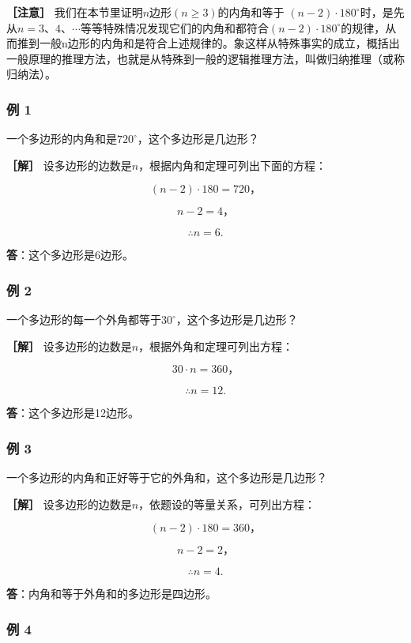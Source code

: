 \textbf{［注意］}
我们在本节里证明\(n\)边形\((n \geqslant 3)\)的内角和等于
\((n-2)\cdot180^{\circ}\)时，是先从\(n=3\text{、}4\text{、}\cdots\)等等特殊情况发现它们的内角和都符合\((n-2)\cdot180^{\circ}\)的规律，从而推到一般n边形的内角和是符合上述规律的。象这样从特殊事实的成立，概括出一般原理的推理方法，也就是从特殊到一般的逻辑推理方法，叫做归纳推理（或称归纳法）。

\subsubsection{例 1}

一个多边形的内角和是\(720^{\circ}\)，这个多边形是几边形？

\textbf{［解］} 设多边形的边数是\(n\)，根据内角和定理可列出下面的方程：

\[
(n - 2) \cdot 180 = 720\text{，}
\]

\[
n - 2 = 4\text{，}
\]

\[
\therefore n = 6.
\]

\textbf{答}：这个多边形是6边形。

\subsubsection{例 2}

一个多边形的每一个外角都等于\(30^{\circ}\)，这个多边形是几边形？

\textbf{［解］} 设多边形的边数是\(n\)，根据外角和定理可列出方程：

\[
30 \cdot n = 360\text{，}
\]

\[
\therefore n = 12.
\]

\textbf{答}：这个多边形是12边形。

\subsubsection{例 3}

一个多边形的内角和正好等于它的外角和，这个多边形是几边形？

\textbf{［解］} 设多边形的边数是\(n\)，依题设的等量关系，可列出方程：

\[
(n - 2) \cdot 180 = 360\text{，}
\]

\[
n - 2 = 2\text{，}
\]

\[
\therefore n = 4.
\]

\textbf{答}：内角和等于外角和的多边形是四边形。

\subsubsection{例 4}

